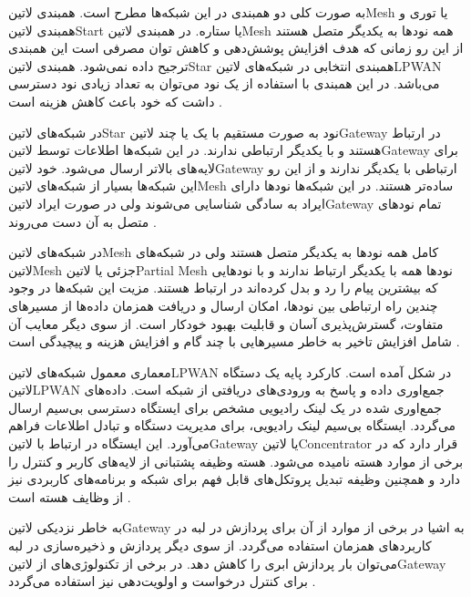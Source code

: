 
به صورت کلی دو همبندی در این شبکه‌ها مطرح است. همبندی ‌لاتین{Mesh} یا توری
و همبندی ‌لاتین{Start} یا ستاره.
در همبندی ‌لاتین{Mesh} همه نودها به یکدیگر متصل هستند از این رو زمانی که هدف
افزایش پوشش‌دهی و کاهش توان مصرفی است این همبندی ترجیح داده نمی‌شود. همبندی
‌لاتین{Star} همبندی انتخابی در شبکه‌های ‌لاتین{LPWAN} می‌باشد.
در این همبندی با استفاده از یک نود می‌توان به تعداد زیادی نود دسترسی داشت که
خود باعث کاهش هزینه است
.

در شبکه‌های ‌لاتین{Star} نود به صورت مستقیم با یک یا چند ‌لاتین{Gateway} در ارتباط هستند
و با یکدیگر ارتباطی ندارند. در این شبکه‌ها اطلاعات توسط ‌لاتین{Gateway} برای لایه‌های بالاتر ارسال می‌شود.
خود ‌لاتین{Gateway} ارتباطی با یکدیگر ندارند و از این رو این شبکه‌ها بسیار از شبکه‌های ‌لاتین{Mesh} ساده‌تر هستند.
در این شبکه‌ها نودها دارای ایراد به سادگی شناسایی می‌شوند ولی در صورت ایراد ‌لاتین{Gateway} تمام نودهای
متصل به آن دست می‌روند
.

در شبکه‌های ‌لاتین{Mesh} کامل همه نودها به یکدیگر متصل هستند ولی در شبکه‌های ‌لاتین{Mesh} جزئی یا ‌لاتین{Partial Mesh} نودها
همه با یکدیگر ارتباط ندارند و با نودهایی که بیشترین پیام را رد و بدل کرده‌اند در ارتباط هستند.
مزیت این شبکه‌ها در وجود چندین راه ارتباطی بین نودها، امکان ارسال و دریافت همزمان داده‌ها از مسیرهای متفاوت،
گسترش‌پذیری آسان و قابلیت بهبود خودکار است. از سوی دیگر معایب آن شامل افزایش تاخیر به خاطر مسیرهایی با چند گام و
افزایش هزینه و پیچیدگی است
.


معماری معمول شبکه‌های ‌لاتین{LPWAN} در شکل  آمده است.
کارکرد پایه یک دستگاه ‌لاتین{LPWAN} جمع‌اوری داده و پاسخ به ورودی‌های دریافتی از شبکه است.
داده‌های جمع‌اوری شده در یک لینک رادیویی مشخص برای ایستگاه دسترسی بی‌سیم ارسال می‌گردد.
ایستگاه بی‌سیم لینک رادیویی، برای مدیریت دستگاه و تبادل اطلاعات فراهم می‌آورد.
این ایستگاه در ارتباط با ‌لاتین{Gateway} یا ‌لاتین{Concentrator} قرار دارد که در برخی از موارد هسته نامیده می‌شود.
هسته وظیفه پشتبانی از لایه‌های کاربر و کنترل را دارد و همچنین وظیفه تبدیل پروتکل‌های قابل فهم برای شبکه و برنامه‌های کاربردی نیز از وظایف هسته است
.

به خاطر نزدیکی ‌لاتین{Gateway} به اشیا در برخی از موارد از آن برای پردازش در لبه در کاربردهای همزمان استفاده می‌گردد.
از سوی دیگر پردازش و ذخیره‌سازی در لبه می‌توان بار پردازش ابری را کاهش دهد. در برخی از تکنولوژی‌های
از ‌لاتین{Gateway} برای کنترل درخواست و اولویت‌دهی نیز استفاده می‌گردد
.

